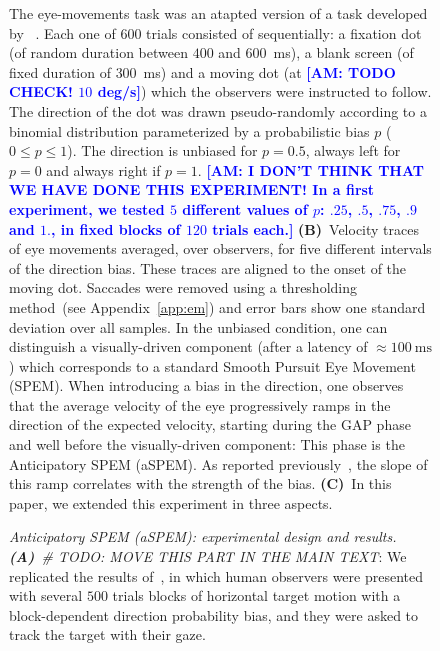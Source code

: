 \documentclass[12pt,english]{article}%
\newcommand{\ms}{\si{\milli\second}}%
\newcommand{\citep}[1]{\parencite{#1}}
\newcommand{\citet}[1]{\textcite{#1}}
\newcommand{\seeApp}[1]{Appendix~\ref{app:#1}}
\newcommand{\LP}[1]{\textbf{\textcolor{red}{[LP: #1]}}}
\newcommand{\AM}[1]{\textbf{\textcolor{blue}{[AM: #1]}}}
\begin{document}
\begin{figure}
{\caption{\emph{Anticipatory SPEM (aSPEM): experimental design and results. \textbf{(A)}~# TODO: MOVE THIS PART IN THE MAIN TEXT}:
We replicated the results of~\citet{Montagnini2010},
in which human observers were presented with several $500$ trials blocks of horizontal target motion with a block-dependent direction probability bias, and they were asked to track the target with their gaze.} %
The eye-movements task was an atapted version of a task developed by ~\citet{Montagnini2010}. Each one of $600$ trials consisted of sequentially:
a fixation dot (of random duration between $400$ and $600$~\ms),
a blank screen (of fixed duration of  $300$~\ms) and
a moving dot (at \AM{TODO CHECK! $10$ deg/s}) which the observers were instructed to follow.
The direction of the dot was drawn pseudo-randomly
according to a binomial distribution
parameterized by a probabilistic bias $p$
($0\leq p\leq 1 $). The direction is unbiased for $p=0.5$,
always left for $p=0$ and always right if $p=1$.
\AM{I DON'T THINK THAT WE HAVE DONE THIS EXPERIMENT! In a first experiment,
we %
tested $5$ different values of $p$:
$.25$, $.5$, $.75$, $.9$ and $1.$,
in fixed blocks of $120$ trials each.}
\textbf{(B)}~Velocity traces of eye movements
averaged, over observers, for five different intervals of the direction bias.
These traces are aligned to the onset of the moving dot.
Saccades were removed using a thresholding method~(see \seeApp{em}) and
error bars show one standard deviation over all samples.
In the unbiased condition, one can distinguish
a visually-driven component (after a latency of $\approx 100~\ms$)
which corresponds to a standard Smooth Pursuit Eye Movement (SPEM).
When introducing a bias in the direction,
one observes that the average velocity of the eye progressively ramps
in the direction of the expected velocity, starting during the GAP phase and well before the visually-driven component:
This phase is the Anticipatory SPEM (aSPEM).
As reported previously~\citep{Montagnini2010, SantosKowler2017,Damasse18},
the slope of this ramp correlates with the strength of the bias.
\textbf{(C)}~In this paper, we extended this experiment in three aspects.
}
\end{figure}
\end{document}
